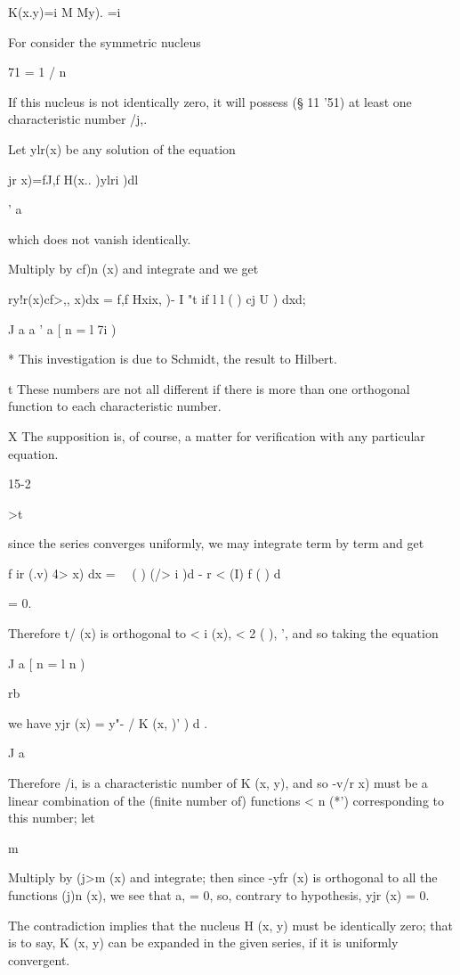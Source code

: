 {K(x.y)=i M My). =i

For consider the symmetric nucleus

71 = 1 / n

If this nucleus is not identically zero, it will possess (§ 11 '51) at
least one characteristic number /j,.

Let ylr(x) be any solution of the equation

 jr x)=fJ,f H(x.. )ylri )dl

' a

which does not vanish identically.

Multiply by cf)n (x) and integrate and we get

ry!r(x)cf>,, x)dx = f,f Hxix, )- I "t if l l ( ) cj U ) dxd;

J a a ' a [ n = l 7i )

* This investigation is due to Schmidt, the result to Hilbert.

t These numbers are not all different if there is more than one
orthogonal function to each characteristic number.

X The supposition is, of course, a matter for verification with any
particular equation.

15-2

>t\

%
%

since the series converges uniformly, we may integrate term by term
and get

f ir (.v) 4> x) dx = \ \ ( ) (/> i )d - r < (I) f ( ) d

= 0.

Therefore t/ (x) is orthogonal to < i (x), < 2 ( ),  ', and so
taking the equation

J a [ n = l n )

rb

we have yjr (x) = y"- / K (x, )' ) d .

J a

Therefore /i, is a characteristic number of K (x, y), and so -v/r x)
must be a linear combination of the (finite number of) functions < n
(*') corresponding to this number; let

m

Multiply by (j>m (x) and integrate; then since -yfr (x) is orthogonal
to all the functions (j)n (x), we see that a, = 0, so, contrary to
hypothesis, yjr (x) = 0.

The contradiction implies that the nucleus H (x, y) must be
identically zero; that is to say, K (x, y) can be expanded in the
given series, if it is uniformly convergent.

}
